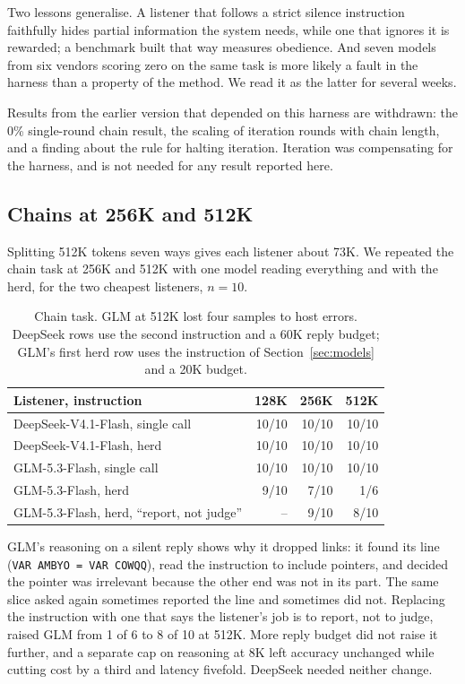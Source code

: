 \documentclass[11pt]{article}
\begin{document}
Two lessons generalise. A listener that follows a strict silence instruction faithfully
hides partial information the system needs, while one that ignores it is rewarded; a
benchmark built that way measures obedience. And seven models from six vendors scoring
zero on the same task is more likely a fault in the harness than a property of the
method. We read it as the latter for several weeks.

Results from the earlier version that depended on this harness are withdrawn: the
0\% single-round chain result, the scaling of iteration rounds with chain length, and a
finding about the rule for halting iteration. Iteration was compensating for the
harness, and is not needed for any result reported here.


\subsection{Chains at 256K and 512K}\label{sec:long}

Splitting 512K tokens seven ways gives each listener about 73K. We repeated the chain
task at 256K and 512K with one model reading everything and with the herd, for the two
cheapest listeners, $n=10$.

\begin{table}[h]
\centering
\begin{tabular}{lrrr}
\toprule
Listener, instruction & 128K & 256K & 512K \\
\midrule
DeepSeek-V4.1-Flash, single call        & 10/10 & 10/10 & 10/10 \\
DeepSeek-V4.1-Flash, herd               & 10/10 & 10/10 & 10/10 \\
GLM-5.3-Flash, single call              & 10/10 & 10/10 & 10/10 \\
GLM-5.3-Flash, herd                     &  9/10 &  7/10 &  1/6  \\
GLM-5.3-Flash, herd, ``report, not judge'' & --  &  9/10 &  8/10 \\
\bottomrule
\end{tabular}
\caption{Chain task. GLM at 512K lost four samples to host errors. DeepSeek rows use the
second instruction and a 60K reply budget; GLM's first herd row uses the instruction of
Section~\ref{sec:models} and a 20K budget.}
\end{table}

GLM's reasoning on a silent reply shows why it dropped links: it found its line
(\texttt{VAR AMBYO = VAR COWQQ}), read the instruction to include pointers, and decided
the pointer was irrelevant because the other end was not in its part. The same slice
asked again sometimes reported the line and sometimes did not. Replacing the instruction
with one that says the listener's job is to report, not to judge, raised GLM from 1 of
6 to 8 of 10 at 512K. More reply budget did not raise it further, and a separate cap on
reasoning at 8K left accuracy unchanged while cutting cost by a third and latency
fivefold. DeepSeek needed neither change.
\end{document}
